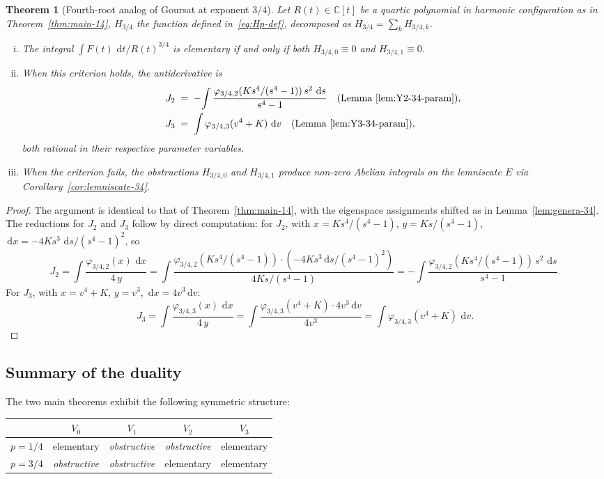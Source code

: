 \documentclass[11pt,a4paper]{article}
\theoremstyle{plain}
\newtheorem{theorem}{Theorem}[section]
\theoremstyle{definition}
\theoremstyle{remark}
\newcommand{\C}{\mathbb{C}}
\renewcommand{\d}{\,\mathrm{d}}
\begin{document}
\begin{theorem}[Fourth-root analog of Goursat at exponent $3/4$]\label{thm:main-34}
Let $R(t) \in \C[t]$ be a quartic polynomial in harmonic configuration as in Theorem~\ref{thm:main-14}, $H_{3/4}$ the function defined in~\eqref{eq:Hp-def}, decomposed as $H_{3/4} = \sum_k H_{3/4,k}$.
\begin{enumerate}[(i)]
  \item The integral $\int F(t)\,\d t / R(t)^{3/4}$ is elementary if and only if both $H_{3/4, 0} \equiv 0$ and $H_{3/4, 1} \equiv 0$.
  \item When this criterion holds, the antiderivative is
  \begin{align*}
    J_2 \;&=\; -\!\int \frac{\varphi_{3/4, 2}(K s^4/(s^4-1))\,s^2\,\d s}{s^4 - 1} \quad\text{(Lemma~\ref{lem:Y2-34-param})}, \\
    J_3 \;&=\; \int \varphi_{3/4, 3}(v^4 + K)\,\d v \quad\text{(Lemma~\ref{lem:Y3-34-param})},
  \end{align*}
  both rational in their respective parameter variables.
  \item When the criterion fails, the obstructions $H_{3/4, 0}$ and $H_{3/4, 1}$ produce non-zero Abelian integrals on the lemniscate $E$ via Corollary~\ref{cor:lemniscate-34}.
\end{enumerate}
\end{theorem}

\begin{proof}
The argument is identical to that of Theorem~\ref{thm:main-14}, with the eigenspace assignments shifted as in Lemma~\ref{lem:genera-34}. The reductions for $J_2$ and $J_3$ follow by direct computation: for $J_2$, with $x = Ks^4/(s^4-1)$, $y = Ks/(s^4-1)$, $\d x = -4K s^3\,\d s/(s^4-1)^2$, so
\[
  J_2 = \int \frac{\varphi_{3/4,2}(x)\,\d x}{4\,y} = \int \frac{\varphi_{3/4,2}(K s^4/(s^4-1)) \cdot (-4K s^3 \d s/(s^4-1)^2)}{4 K s/(s^4 - 1)} = -\!\int \frac{\varphi_{3/4,2}(K s^4/(s^4-1))\,s^2\,\d s}{s^4 - 1}.
\]
For $J_3$, with $x = v^4 + K$, $y = v^3$, $\d x = 4 v^3 \d v$:
\[
  J_3 = \int \frac{\varphi_{3/4,3}(x)\,\d x}{4\,y} = \int \frac{\varphi_{3/4,3}(v^4 + K) \cdot 4 v^3 \d v}{4 v^3} = \int \varphi_{3/4,3}(v^4 + K)\,\d v.
\]
\end{proof}

\subsection*{Summary of the duality}

The two main theorems exhibit the following symmetric structure:
\begin{center}
\begin{tabular}{c|cccc}
& $V_0$ & $V_1$ & $V_2$ & $V_3$ \\
\hline
$p = 1/4$ & elementary & \emph{obstructive} & \emph{obstructive} & elementary \\
$p = 3/4$ & \emph{obstructive} & \emph{obstructive} & elementary & elementary
\end{tabular}
\end{center}
\end{document}
